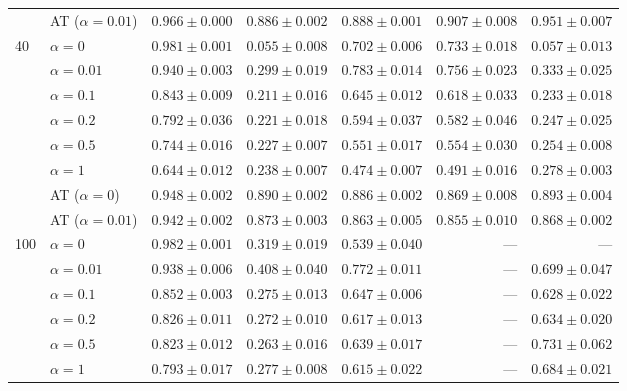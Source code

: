 \begin{tabular}{@{}llrrrrr@{}}
 & AT ($\alpha{=}0.01$) & $0.966 \pm 0.000$ & $0.886 \pm 0.002$ & $0.888 \pm 0.001$ & $0.907 \pm 0.008$ & $0.951 \pm 0.007$ \\
\cmidrule(lr){1-7}
\multirow{8}{*}{40} & $\alpha{=}0$ & $0.981 \pm 0.001$ & $0.055 \pm 0.008$ & $0.702 \pm 0.006$ & $0.733 \pm 0.018$ & $0.057 \pm 0.013$ \\
 & $\alpha{=}0.01$ & $0.940 \pm 0.003$ & $0.299 \pm 0.019$ & $0.783 \pm 0.014$ & $0.756 \pm 0.023$ & $0.333 \pm 0.025$ \\
 & $\alpha{=}0.1$ & $0.843 \pm 0.009$ & $0.211 \pm 0.016$ & $0.645 \pm 0.012$ & $0.618 \pm 0.033$ & $0.233 \pm 0.018$ \\
 & $\alpha{=}0.2$ & $0.792 \pm 0.036$ & $0.221 \pm 0.018$ & $0.594 \pm 0.037$ & $0.582 \pm 0.046$ & $0.247 \pm 0.025$ \\
 & $\alpha{=}0.5$ & $0.744 \pm 0.016$ & $0.227 \pm 0.007$ & $0.551 \pm 0.017$ & $0.554 \pm 0.030$ & $0.254 \pm 0.008$ \\
 & $\alpha{=}1$ & $0.644 \pm 0.012$ & $0.238 \pm 0.007$ & $0.474 \pm 0.007$ & $0.491 \pm 0.016$ & $0.278 \pm 0.003$ \\
 & AT ($\alpha{=}0$) & $0.948 \pm 0.002$ & $0.890 \pm 0.002$ & $0.886 \pm 0.002$ & $0.869 \pm 0.008$ & $0.893 \pm 0.004$ \\
 & AT ($\alpha{=}0.01$) & $0.942 \pm 0.002$ & $0.873 \pm 0.003$ & $0.863 \pm 0.005$ & $0.855 \pm 0.010$ & $0.868 \pm 0.002$ \\
\cmidrule(lr){1-7}
\multirow{6}{*}{100} & $\alpha{=}0$ & $\mathbf{0.982 \pm 0.001}$ & $0.319 \pm 0.019$ & $0.539 \pm 0.040$ & --- & --- \\
 & $\alpha{=}0.01$ & $0.938 \pm 0.006$ & $0.408 \pm 0.040$ & $0.772 \pm 0.011$ & --- & $0.699 \pm 0.047$ \\
 & $\alpha{=}0.1$ & $0.852 \pm 0.003$ & $0.275 \pm 0.013$ & $0.647 \pm 0.006$ & --- & $0.628 \pm 0.022$ \\
 & $\alpha{=}0.2$ & $0.826 \pm 0.011$ & $0.272 \pm 0.010$ & $0.617 \pm 0.013$ & --- & $0.634 \pm 0.020$ \\
 & $\alpha{=}0.5$ & $0.823 \pm 0.012$ & $0.263 \pm 0.016$ & $0.639 \pm 0.017$ & --- & $0.731 \pm 0.062$ \\
 & $\alpha{=}1$ & $0.793 \pm 0.017$ & $0.277 \pm 0.008$ & $0.615 \pm 0.022$ & --- & $0.684 \pm 0.021$ \\
\bottomrule
\end{tabular}
